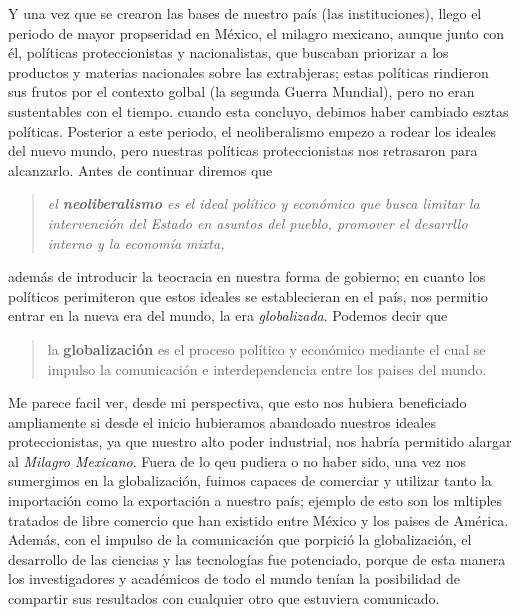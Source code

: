 \documentclass[12pt]{article}
\begin{document}
	\par Y una vez que se crearon las bases de nuestro pa\'is (las instituciones), llego el periodo de mayor propseridad en M\'exico, el milagro mexicano, aunque junto con \'el, pol\'iticas proteccionistas y nacionalistas, que buscaban priorizar a los productos y materias nacionales sobre las extrabjeras; estas pol\'iticas rindieron sus frutos por el contexto golbal (la segunda Guerra Mundial), pero no eran sustentables con el tiempo. cuando esta concluyo, debimos haber cambiado esztas pol\'iticas. Posterior a este periodo, el neoliberalismo empezo a rodear los ideales del nuevo mundo, pero nuestras pol\'iticas proteccionistas nos retrasaron para alcanzarlo. Antes de continuar diremos que
	\begin{quote}\it
		el \textbf{neoliberalismo} es el ideal político y económico que busca limitar la intervención del Estado en asuntos del pueblo, promover el desarrllo interno y la econom\'ia mixta,
	\end{quote}
	además de introducir la teocracia en nuestra forma de gobierno; en cuanto los pol\'iticos perimiteron que estos ideales se establecieran en el pa\'is, nos permitio entrar en la nueva era del mundo, la era \textit{globalizada}. Podemos decir que
	\begin{quote}
		la \textbf{globalización} es el proceso político y económico mediante el cual se impulso la comunicación e interdependencia entre los paises del mundo.
	\end{quote}
	
	\par Me parece facil ver, desde mi perspectiva, que esto nos hubiera beneficiado ampliamente si desde el inicio hubieramos abandoado nuestros ideales proteccionistas, ya que nuestro alto poder industrial, nos habr\'ia permitido alargar al \textit{Milagro Mexicano}. Fuera de lo qeu pudiera o no haber sido, una vez nos sumergimos en la globalizaci\'on, fuimos capaces de comerciar y utilizar tanto la importaci\'on como la exportaci\'on a nuestro pa\'is; ejemplo de esto son los mltiples tratados de libre comercio que han existido entre M\'exico y los paises de Am\'erica. Adem\'as, con el impulso de la comunicaci\'on que porpici\'o la globalizaci\'on, el desarrollo de las ciencias y las tecnolog\'ias fue potenciado, porque de esta manera los investigadores y acad\'emicos de todo el mundo ten\'ian la posibilidad de compartir sus resultados con cualquier otro que estuviera comunicado.
	
\end{document}
